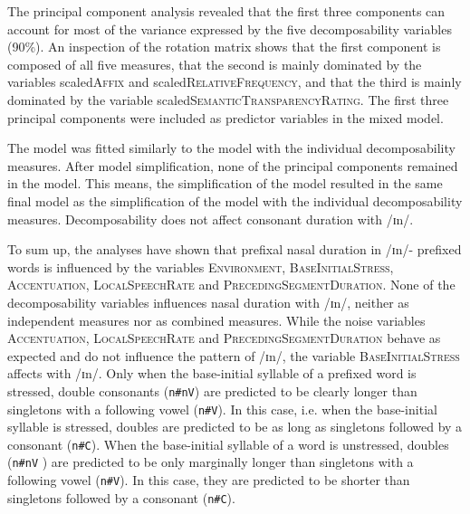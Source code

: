 The principal component analysis revealed that the first three components can account for most of the variance expressed by the five decomposability variables (90\%). An inspection of the rotation matrix shows that the first component is composed of all five measures, that the second is mainly dominated by the variables scaled\textsc{Affix} and scaled\textsc{RelativeFrequency}, and that the third is mainly dominated by the variable scaled\textsc{SemanticTransparencyRating}. 
The first three principal components were included as predictor variables in the mixed model.  


The model was fitted similarly to the model with the individual decomposability measures. After model simplification, none of the principal components remained in the model. This means, the simplification of the model resulted in the same final model as the simplification of the model with the individual decomposability measures. Decomposability does not affect consonant duration with /ɪn/.




To sum up, the analyses have shown that prefixal nasal duration in /ɪn/- prefixed words is influenced by the variables \textsc{Environment}, \textsc{BaseInitialStress}, \textsc{Accentuation}, \textsc{LocalSpeechRate} and \textsc{PrecedingSegmentDuration}. None of the decomposability variables influences nasal duration with /ɪn/, neither as independent measures nor as combined measures. 
While the noise variables \textsc{Accentuation}, \textsc{LocalSpeechRate} and \textsc{PrecedingSegmentDuration} behave as expected and do not influence the  pattern of /ɪn/, the variable \textsc{BaseInitialStress} affects  with /ɪn/. 
Only when the base-initial syllable of a prefixed word is stressed, double consonants (\texttt{n\#nV}) are predicted to be clearly longer than singletons with a following vowel (\texttt{n\#V}). In this case, i.e. when the base-initial syllable is stressed, doubles are predicted to be as long as singletons followed by a consonant (\texttt{n\#C}). When the base-initial syllable of a word is unstressed, doubles (\texttt{n\#nV} ) are predicted to be only marginally longer than singletons with a following vowel (\texttt{n\#V}). In this case, they are predicted to be shorter than singletons followed by a consonant (\texttt{n\#C}).

